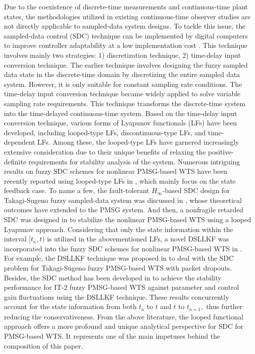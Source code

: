 \documentclass[preprint,11pt]{elsarticle}
\begin{document}
{Due to the coexistence of discrete-time measurements and continuous-time plant states, the methodologies utilized in existing continuous-time observer studies are not directly applicable to sampled-data system designs. To tackle this issue, the sampled-data control (SDC) technique can be implemented by digital computers to improve controller adaptability at a low implementation cost \cite{PMSM, Mass,vijay}. This technique involves mainly two strategies: 1) discretization technique, 2) time-delay input conversion technique. The earlier technique involves designing the fuzzy sampled data state in the discrete-time domain by discretizing the entire sampled data system. However, it is only suitable for constant sampling rate conditions. The time-delay input conversion technique became widely applied to solve variable sampling rate requirements. This technique transforms the discrete-time system into the time-delayed continuous-time system. Based on the time-delay input conversion technique, various forms of Lyapunov functionals (LFs) have been developed, including looped-type LFs, discontinuous-type LFs, and time-dependent LFs. Among these, the looped-type LFs have garnered increasingly extensive consideration due to their unique benefits of relaxing the positive-definite requirements for stability analysis of the system. Numerous intriguing results on fuzzy SDC schemes for nonlinear PMSG-based WTS have been recently reported using looped-type LFs in \cite{PMSG1,PMSG2}, which mainly focus on the state feedback case. To name a few, the fault-tolerant $H_{\infty}$-based SDC design for {Takagi-Sugeno} fuzzy sampled-data system was discussed in \cite{vel1}, whose theoretical outcomes have extended to the PMSG system. And then, a nonfragile retarded SDC was designed in \cite{PMSG3} to stabilize the nonlinear PMSG-based WTS using a looped Lyapunov approach. Considering that only the state information within the interval $[t_\kappa,t)$ is utilized in the abovementioned LFs, a novel DSLLKF was incorporated into the fuzzy SDC schemes for nonlinear PMSG-based WTS in \cite{New-1,New-3}. For example, the DSLLKF technique was proposed in \cite{New-2} to deal with the SDC problem for {Takagi-Sugeno} fuzzy PMSG-based WTS with packet dropouts. Besides, the SDC method has been developed in \cite{New-4} to achieve the stability performance for IT-2 fuzzy PMSG-based WTS against parameter and control gain fluctuations using the DSLLKF technique. These results concurrently account for the state information from both $t_\kappa$ to $t$ and $t$ to $t_{\kappa+1},$ thus further reducing the conservativeness. From the above literature, the looped functional approach offers a more profound and unique analytical perspective for SDC for PMSG-based WTS. It represents one of the main impetuses behind the composition of this paper.}
\end{document}
